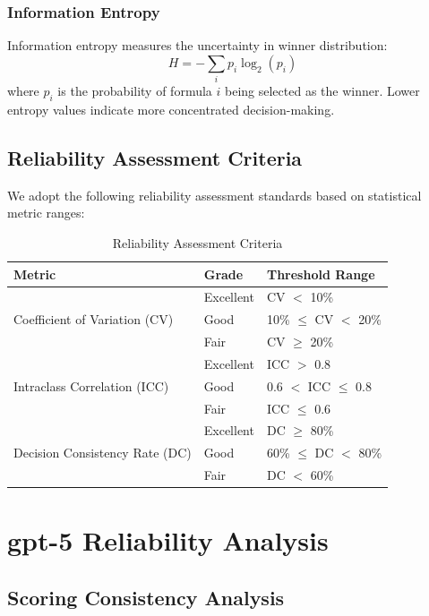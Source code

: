 \documentclass[12pt,a4paper]{article}
\begin{document}
\subsubsection{Information Entropy}
Information entropy measures the uncertainty in winner distribution:
\begin{equation}
    H = -\sum_{i} p_i \log_2(p_i)
\end{equation}
where $p_i$ is the probability of formula $i$ being selected as the winner. Lower entropy values indicate more concentrated decision-making.

\subsection{Reliability Assessment Criteria}
We adopt the following reliability assessment standards based on statistical metric ranges:

\begin{table}[H]
\centering
\caption{Reliability Assessment Criteria}
\begin{tabular}{lll}
\toprule
\textbf{Metric} & \textbf{Grade} & \textbf{Threshold Range} \\
\midrule
\multirow{3}{*}{Coefficient of Variation (CV)} & Excellent & CV $<$ 10\% \\
& Good & 10\% $\le$ CV $<$ 20\% \\
& Fair & CV $\ge$ 20\% \\
\midrule
\multirow{3}{*}{Intraclass Correlation (ICC)} & Excellent & ICC $>$ 0.8 \\
& Good & 0.6 $<$ ICC $\le$ 0.8 \\
& Fair & ICC $\le$ 0.6 \\
\midrule
\multirow{3}{*}{Decision Consistency Rate (DC)} & Excellent & DC $\ge$ 80\% \\
& Good & 60\% $\le$ DC $<$ 80\% \\
& Fair & DC $<$ 60\% \\
\bottomrule
\end{tabular}
\end{table}

\newpage


\section{gpt-5 Reliability Analysis}

\subsection{Scoring Consistency Analysis}
\end{document}
